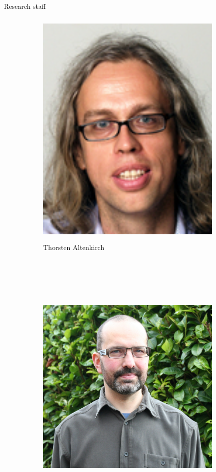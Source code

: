\documentclass[final]{beamer}
\newlength{\threecolwid}
\newcommand{\vsp}{\vspace*{2cm}}
\begin{document}
\begin{frame}[t]
\begin{columns}[t]
\begin{column}{\threecolwid}
\vsp

\begin{block}{Research staff}


\begin{figure}
        \centering
        \begin{subfigure}[b]{0.2\textwidth}
                \centering
                \includegraphics[height=12cm]{thorstenaltenkirch.jpg}
                \caption*{Thorsten Altenkirch}
        \end{subfigure}%
        ~ %
        \begin{subfigure}[b]{0.2\textwidth}
                \centering
                \includegraphics[height=12cm]{venanzio_capretta_portrait.jpg}

\end{subfigure}
\end{figure}
\end{block}
\end{column}
\end{columns}
\end{frame}
\end{document}
